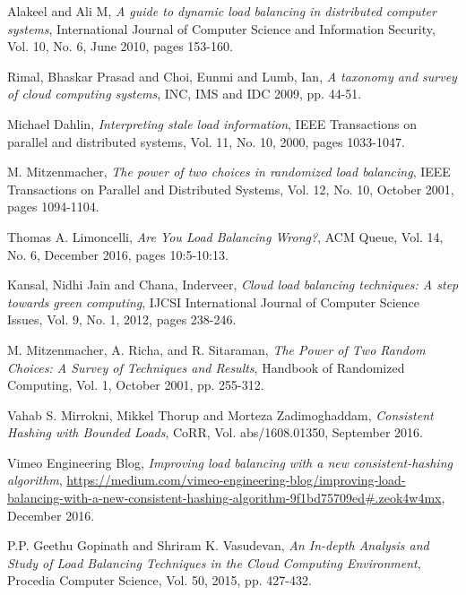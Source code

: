 \begin{thebibliography}{1}

Alakeel and Ali M, \emph{A guide to dynamic load balancing in distributed
  computer systems}, International Journal of Computer Science and Information
  Security, Vol. 10, No. 6, June 2010, pages 153-160.

  Rimal, Bhaskar Prasad and Choi, Eunmi and Lumb, Ian,
  \emph{A taxonomy and survey of cloud computing systems},
  INC, IMS and IDC
  2009, pp. 44-51.

Michael Dahlin, \emph{Interpreting stale load information},
  IEEE Transactions on parallel and distributed systems,
  Vol. 11, No. 10, 2000, pages 1033-1047.

M. Mitzenmacher, \emph{The power of two choices in randomized load balancing},
  IEEE Transactions on Parallel and Distributed Systems,
  Vol. 12, No. 10, October 2001, pages 1094-1104.

  Thomas A. Limoncelli, \emph{Are You Load Balancing Wrong?},
  ACM Queue,
  Vol. 14, No. 6, December 2016, pages 10:5-10:13.

  Kansal, Nidhi Jain and Chana, Inderveer,
  \emph{Cloud load balancing techniques: A step towards green computing},
  IJCSI International Journal of Computer Science Issues,
  Vol. 9, No. 1, 2012, pages 238-246.

M. Mitzenmacher, A. Richa, and R. Sitaraman,
  \emph{The Power of Two Random Choices: A Survey of Techniques and Results},
  Handbook of Randomized Computing,
  Vol. 1, October 2001, pp. 255-312.

Vahab S. Mirrokni, Mikkel Thorup and Morteza Zadimoghaddam,
  \emph{Consistent Hashing with Bounded Loads},
  CoRR,
  Vol. abs/1608.01350, September 2016.

Vimeo Engineering Blog, \emph{Improving load balancing with a new consistent-hashing algorithm},
  \url{https://medium.com/vimeo-engineering-blog/improving-load-balancing-with-a-new-consistent-hashing-algorithm-9f1bd75709ed#.zeok4w4mx},
  December 2016.

  P.P. Geethu Gopinath and Shriram K. Vasudevan, \emph{An In-depth Analysis and Study of Load Balancing Techniques in the Cloud Computing Environment},
  Procedia Computer Science,
  Vol. 50, 2015, pp. 427-432.


\end{thebibliography}

